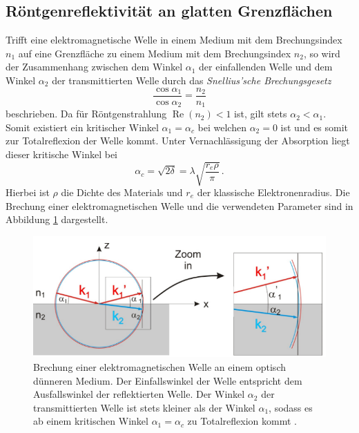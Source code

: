 \subsection*{Röntgenreflektivität an glatten Grenzflächen}
Trifft eine elektromagnetische Welle in einem Medium mit dem Brechungsindex $n_1$ auf eine Grenzfläche zu einem Medium mit dem Brechungsindex $n_2$, so wird der Zusammenhang zwischen dem Winkel $\alpha_1$ der einfallenden Welle und dem Winkel $\alpha_2$ der transmittierten Welle durch das \textit{Snellius'sche Brechungsgesetz}
\begin{equation}
    \frac{\cos{\alpha_1}}{\cos{\alpha_2}}=\frac{n_2}{n_1}
\end{equation}
beschrieben.
Da für Röntgenstrahlung $\operatorname{Re}(n_2)<1$ ist, gilt stets $\alpha_2 < \alpha_1$.
Somit existiert ein kritischer Winkel $\alpha_1 = \alpha_c$ bei welchen $\alpha_2=0$ ist und es somit zur Totalreflexion der Welle kommt.
Unter Vernachlässigung der Absorption liegt dieser kritische Winkel bei 
\begin{equation}
    \alpha_c = \sqrt{2\delta} = \lambda \sqrt{\frac{r_e \rho}{\pi}}\, .
\end{equation}
Hierbei ist $\rho$ die Dichte des Materials und $r_e$ der klassische Elektronenradius.
Die Brechung einer elektromagnetischen Welle und die verwendeten Parameter sind in Abbildung \ref{fig:tfig1} dargestellt.
\begin{figure}[H]
\centering
\includegraphics[width=0.8\linewidth]{figures/Reflexion}
\caption{Brechung einer elektromagnetischen Welle an einem optisch dünneren Medium. 
Der Einfallswinkel der Welle entspricht dem Ausfallswinkel der reflektierten Welle. 
Der Winkel $\alpha_2$ der transmittierten Welle ist stets kleiner als der Winkel $\alpha_1$, sodass es ab einem kritischen Winkel $\alpha_1 = \alpha_c$ zu Totalreflexion kommt \cite{XSR}.}
\label{fig:tfig1}
\end{figure}

